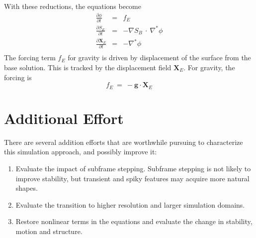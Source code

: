 \documentclass{article}
\def\gvec{\textbf{g}}
\def\Xvec{\textbf{X}}
\def\inabla{\nabla^{*}}
\begin{document}
With these reductions, the equations become
\begin{eqnarray}
\frac{\partial \phi}{\partial t} &=& f_E \\
\frac{\partial S_E}{\partial t}  &=& -\nabla S_B\ \cdot\ \inabla\phi \\
\frac{\partial \Xvec_E}{\partial t} &=& -\inabla\phi \\
\end{eqnarray}
The forcing term $f_E$ for gravity is driven by displacement of the surface from the base solution.  This is tracked by the displacement field $\Xvec_E$.  For gravity, the forcing is
\begin{equation}
f_E \ =\ -\gvec\cdot\Xvec_E
\end{equation}


\section{Additional Effort}

There are several addition efforts that are worthwhile pursuing to characterize this simulation approach, and possibly improve it:
\begin{enumerate}
\item Evaluate the impact of subframe stepping.  Subframe stepping is not likely to improve stability, but transient and spiky features may acquire more natural shapes.
\item Evaluate the transition to higher resolution and larger simulation domains.  
\item Restore nonlinear terms in the equations and evaluate the change in stability, motion and structure.
\end{enumerate}
\end{document}
